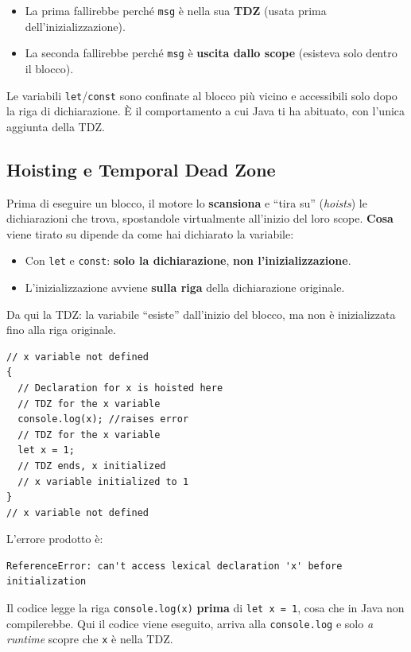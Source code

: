 \documentclass[10pt,a4paper]{article}
\begin{document}
\begin{itemize}
  \item La prima fallirebbe perché \texttt{msg} è nella sua \textbf{TDZ} (usata prima dell'inizializzazione).
  \item La seconda fallirebbe perché \texttt{msg} è \textbf{uscita dallo scope} (esisteva solo dentro il blocco).
\end{itemize}

Le variabili \texttt{let}/\texttt{const} sono confinate al blocco più vicino e accessibili solo dopo la riga di dichiarazione. È il comportamento a cui Java ti ha abituato, con l'unica aggiunta della TDZ.

\subsection{Hoisting e Temporal Dead Zone}

Prima di eseguire un blocco, il motore lo \textbf{scansiona} e ``tira su'' (\emph{hoists}) le dichiarazioni che trova, spostandole virtualmente all'inizio del loro scope. \textbf{Cosa} viene tirato su dipende da come hai dichiarato la variabile:

\begin{itemize}
  \item Con \texttt{let} e \texttt{const}: \textbf{solo la dichiarazione}, \textbf{non l'inizializzazione}.
  \item L'inizializzazione avviene \textbf{sulla riga} della dichiarazione originale.
\end{itemize}

Da qui la TDZ: la variabile ``esiste'' dall'inizio del blocco, ma non è inizializzata fino alla riga originale.

\begin{lstlisting}[style=js]
// x variable not defined
{
  // Declaration for x is hoisted here
  // TDZ for the x variable
  console.log(x); //raises error
  // TDZ for the x variable
  let x = 1;
  // TDZ ends, x initialized
  // x variable initialized to 1
}
// x variable not defined
\end{lstlisting}

L'errore prodotto è:

\begin{lstlisting}[style=plain]
ReferenceError: can't access lexical declaration 'x' before initialization
\end{lstlisting}

Il codice legge la riga \texttt{console.log(x)} \textbf{prima} di \texttt{let x = 1}, cosa che in Java non compilerebbe. Qui il codice viene eseguito, arriva alla \texttt{console.log} e solo \emph{a runtime} scopre che \texttt{x} è nella TDZ.
\end{document}
